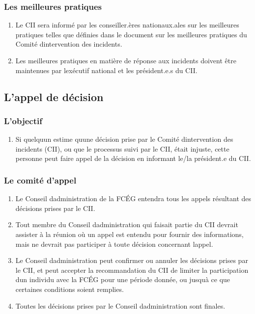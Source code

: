 \subsubsection{Les meilleures pratiques}
\label{les-meilleures-pratiques}

\begin{enumerate}
 \item
  Le CII sera informé par les conseiller.ères nationaux.ales sur les meilleures pratiques telles que définies dans le document sur les meilleures pratiques du Comité d\textquotesingle intervention des incidents.
 \item
  Les meilleures pratiques en matière de réponse aux incidents doivent être maintenues par l\textquotesingle exécutif national et les président.e.s du CII.
\end{enumerate}

\subsection{L'appel de décision}
\label{l-appel-de-decision}

\subsubsection{L'objectif}
\label{lobjectif-3}

\begin{enumerate}
 \item
  Si quelqu\textquotesingle un estime qu\textquotesingle une décision prise par le Comité d\textquotesingle intervention des incidents (CII), ou que le processus suivi par le CII, était injuste, cette personne peut faire appel de la décision en informant le/la président.e du CII.
\end{enumerate}

\subsubsection{Le comité d'appel}
\label{le-comite-d-appel}

\begin{enumerate}
 \item
  Le Conseil d\textquotesingle administration de la FCÉG entendra tous les appels résultant des décisions prises par le CII.
 \item
  Tout membre du Conseil d\textquotesingle administration qui faisait partie du CII devrait assister à la réunion où un appel est entendu pour fournir des informations, mais ne devrait pas participer à toute décision concernant l\textquotesingle appel.
 \item
  Le Conseil d\textquotesingle administration peut confirmer ou annuler les décisions prises par le CII, et peut accepter la recommandation du CII de limiter la participation d\textquotesingle un individu avec la FCÉG pour une période donnée, ou jusqu\textquotesingle à ce que certaines conditions soient remplies.
 \item
  Toutes les décisions prises par le Conseil d\textquotesingle administration sont finales.
\end{enumerate}

